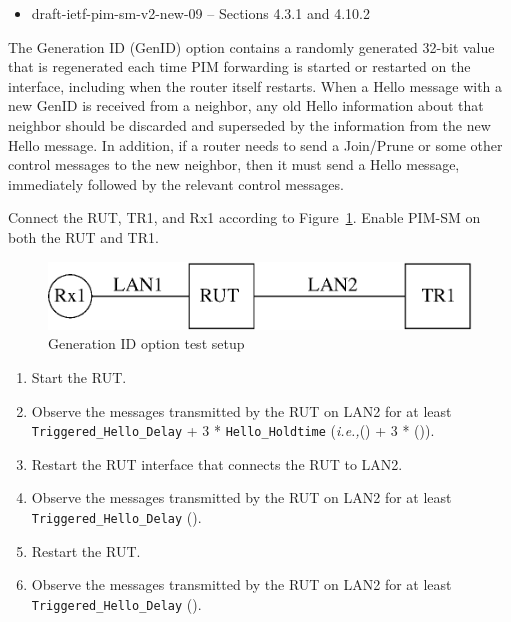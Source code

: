 \documentclass[11pt]{report}
\newcommand{\ie}{\emph{i.e.,}\xspace}
\begin{document}
\begin{itemize}
  \item draft-ietf-pim-sm-v2-new-09 -- Sections 4.3.1 and 4.10.2
\end{itemize}

The Generation ID (GenID) option contains a randomly generated 32-bit value
that is regenerated each time PIM forwarding is started or restarted on the
interface, including when the router itself restarts. When a Hello message
with a new GenID is received from a neighbor, any old Hello information about
that neighbor should be discarded and superseded by the information from the
new Hello message. In addition, if a router needs to send a Join/Prune or some
other control messages to the new neighbor, then it must send a Hello
message, immediately followed by the relevant control messages.

Connect the RUT, TR1, and Rx1 according to
Figure~\ref{fig:pim_test_2_6_generation_id_option}.
Enable PIM-SM on both the RUT and TR1.

\begin{figure}[htbp]
  \begin{center}
    \includegraphics[scale=0.8]{figs/pim_test_2_6_generation_id_option}
    \caption{Generation ID option test setup}
    \label{fig:pim_test_2_6_generation_id_option}
  \end{center}
\end{figure}



\begin{enumerate}

  \item Start the RUT.

  \item Observe the messages transmitted by the RUT on LAN2 for at least
        \verb=Triggered_Hello_Delay= + 3 * \verb=Hello_Holdtime=
        (\ie ({\PimsmTriggeredHelloDelay}) + 3 * ({\PimsmHelloHoldtime})).

  \item Restart the RUT interface that connects the RUT to LAN2.

  \item Observe the messages transmitted by the RUT on LAN2 for at least
        \verb=Triggered_Hello_Delay= ({\PimsmTriggeredHelloDelay}).

  \item Restart the RUT.

  \item Observe the messages transmitted by the RUT on LAN2 for at least
        \verb=Triggered_Hello_Delay= ({\PimsmTriggeredHelloDelay}).

\end{enumerate}
\end{document}
